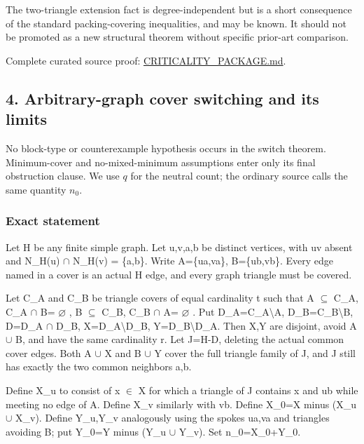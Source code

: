 \documentclass[11pt]{article}
\begin{document}
The two-triangle extension fact is degree-independent but is a short consequence of the standard packing-covering inequalities, and may be known. It should not be promoted as a new structural theorem without specific prior-art comparison.

Complete curated source proof: \href{https://github.com/pappa211/ai-math-experiments/blob/main/problems/TUZA-07/notes/CRITICALITY_PACKAGE.md}{CRITICALITY\_PACKAGE.md}.

\subsection{4. Arbitrary-graph cover switching and its limits}\label{arbitrary-graph-cover-switching-and-its-limits}

No block-type or counterexample hypothesis occurs in the switch theorem. Minimum-cover and no-mixed-minimum assumptions enter only its final obstruction clause. We use \(q\) for the neutral count; the ordinary source calls the same quantity \(n_0\).

\subsubsection{Exact statement}\label{exact-statement}

Let H be any finite simple graph. Let u,v,a,b be distinct vertices, with uv absent and N\_H(u) \(\cap\) N\_H(v) = \{a,b\}. Write A=\{ua,va\}, B=\{ub,vb\}. Every edge named in a cover is an actual H edge, and every graph triangle must be covered.

Let C\_A and C\_B be triangle covers of equal cardinality t such that A \(\subseteq\) C\_A, C\_A \(\cap\) B= \(\varnothing\) , B \(\subseteq\) C\_B, C\_B \(\cap\) A= \(\varnothing\) . Put D\_A=C\_A\textbackslash A, D\_B=C\_B\textbackslash B, D=D\_A \(\cap\) D\_B, X=D\_A\textbackslash D\_B, Y=D\_B\textbackslash D\_A. Then X,Y are disjoint, avoid A \(\cup\) B, and have the same cardinality r. Let J=H-D, deleting the actual common cover edges. Both A \(\cup\) X and B \(\cup\) Y cover the full triangle family of J, and J still has exactly the two common neighbors a,b.

Define X\_u to consist of x \(\in\) X for which a triangle of J contains x and ub while meeting no edge of A. Define X\_v similarly with vb. Define X\_0=X minus (X\_u \(\cup\) X\_v). Define Y\_u,Y\_v analogously using the spokes ua,va and triangles avoiding B; put Y\_0=Y minus (Y\_u \(\cup\) Y\_v). Set n\_0=\textbar X\_0\textbar+\textbar Y\_0\textbar.
\end{document}
